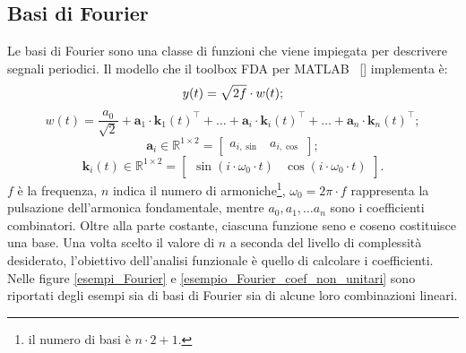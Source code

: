 \subsection[Basi di Fourier]{Basi di Fourier}
Le basi di Fourier sono una classe di funzioni che viene impiegata per descrivere segnali periodici. Il modello che il toolbox FDA per MATLAB~ [\cite{paper_FDA_toolbox}] implementa è:
\[
	y(t) = \sqrt{2f}\cdot w(t)\\;
\]
\[
	w(t) = \frac{a_0}{\sqrt{2}} + \mathbf{a}_1\cdot \mathbf{k}_1(t)^\top +\dots + \mathbf{a}_i\cdot \mathbf{k}_i(t)^\top + \dots + \mathbf{a}_n\cdot \mathbf{k}_n(t)^\top;
\]
\[
	\mathbf{a}_i\in\mathbb{R}^{1\times2} =
	\begin{bmatrix}
		a_{i, \sin} & a_{i, \cos}
	\end{bmatrix};
\]
\[
	\mathbf{k}_i(t)\in\mathbb{R}^{1\times 2} =
	\begin{bmatrix}
		\sin\left(i\cdot\omega_0\cdot t\right) & \cos\left(i\cdot\omega_0\cdot t\right)
	\end{bmatrix}.
\]
$f$ è la frequenza, $n$ indica il numero di armoniche\footnote{il numero di basi è $n\cdot 2 + 1$.}, $\omega_0 = 2\pi\cdot f$ rappresenta la pulsazione dell'armonica fondamentale, mentre $a_0, a_1,\dots a_n$ sono i coefficienti combinatori. Oltre alla parte costante, ciascuna funzione seno e coseno costituisce una base. Una volta scelto il valore di $n$ a seconda del livello di complessità desiderato, l'obiettivo dell'analisi funzionale è quello di calcolare i coefficienti. Nelle figure \ref{esempi_Fourier} e \ref{esempio_Fourier_coef_non_unitari} sono riportati degli esempi sia di basi di Fourier sia di alcune loro combinazioni lineari.


